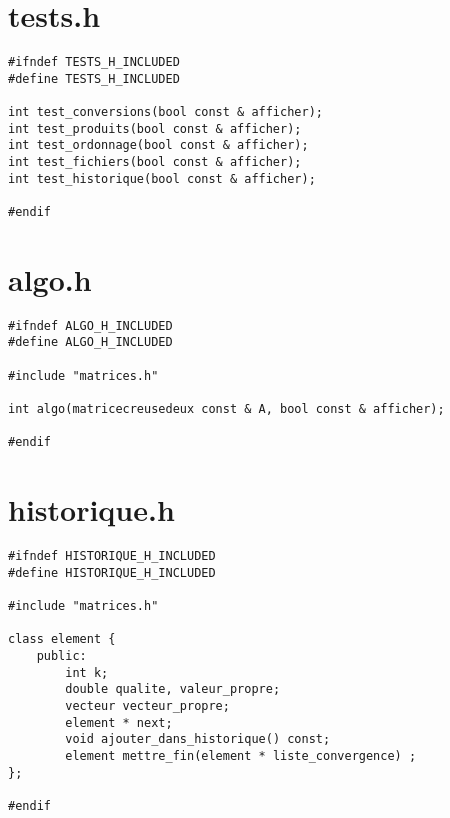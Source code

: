 \documentclass[a4paper]{article}
\begin{document}
\section{tests.h}
\begin{verbatim}
#ifndef TESTS_H_INCLUDED
#define TESTS_H_INCLUDED

int test_conversions(bool const & afficher);
int test_produits(bool const & afficher);
int test_ordonnage(bool const & afficher);
int test_fichiers(bool const & afficher);
int test_historique(bool const & afficher);

#endif
\end{verbatim}

\section{algo.h}
\begin{verbatim}
#ifndef ALGO_H_INCLUDED
#define ALGO_H_INCLUDED

#include "matrices.h"

int algo(matricecreusedeux const & A, bool const & afficher);

#endif
\end{verbatim}

\section{historique.h}
\begin{verbatim}
#ifndef HISTORIQUE_H_INCLUDED
#define HISTORIQUE_H_INCLUDED

#include "matrices.h"

class element {
    public:
        int k;
        double qualite, valeur_propre;
        vecteur vecteur_propre;
        element * next;
        void ajouter_dans_historique() const;
        element mettre_fin(element * liste_convergence) ;
};

#endif
\end{verbatim}
\end{document}
